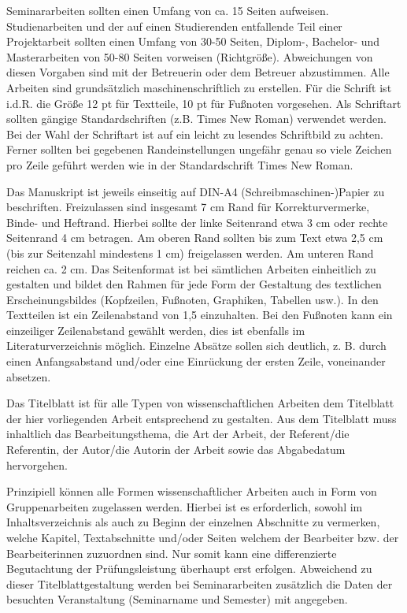 \documentclass[a4paper, 12pt]{article}
\begin{document}
Seminararbeiten sollten einen Umfang von ca. 15 Seiten aufweisen. Studienarbeiten
und der auf einen Studierenden entfallende Teil einer Projektarbeit sollten einen
Umfang von 30-50 Seiten, Diplom-, Bachelor- und Masterarbeiten von 50-80 Seiten
vorweisen (Richtgr\"{o}\ss e). Abweichungen von diesen Vorgaben sind mit der Betreuerin
oder dem Betreuer abzustimmen. Alle Arbeiten sind grunds\"{a}tzlich maschinenschriftlich
zu erstellen. F\"{u}r die Schrift ist i.d.R. die Gr\"{o}\ss e 12 pt f\"{u}r Textteile, 10 pt f\"{u}r
Fu\ss noten vorgesehen. Als Schriftart sollten g\"{a}ngige Standardschriften (z.B. Times
New Roman) verwendet werden. Bei der Wahl der Schriftart ist auf ein leicht zu
lesendes Schriftbild zu achten. Ferner sollten bei gegebenen Randeinstellungen
ungef\"{a}hr genau so viele Zeichen pro Zeile gef\"{u}hrt werden wie in der Standardschrift
Times New Roman.

Das Manuskript ist jeweils einseitig auf DIN-A4 (Schreibmaschinen-)Papier zu
beschriften. Freizulassen sind insgesamt 7 cm Rand f\"{u}r Korrekturvermerke, Binde- und
Heftrand. Hierbei sollte der linke Seitenrand etwa 3 cm oder rechte Seitenrand 4 cm
betragen. Am oberen Rand sollten bis zum Text etwa 2,5 cm (bis zur Seitenzahl
mindestens 1 cm) freigelassen werden. Am unteren Rand reichen ca. 2 cm. Das
Seitenformat ist bei s\"{a}mtlichen Arbeiten einheitlich zu gestalten und bildet den
Rahmen f\"{u}r jede Form der Gestaltung des textlichen Erscheinungsbildes (Kopfzeilen,
Fu\ss noten, Graphiken, Tabellen usw.). In den Textteilen ist ein Zeilenabstand von 1,5
einzuhalten. Bei den Fu\ss noten kann ein einzeiliger Zeilenabstand gew\"{a}hlt werden,
dies ist ebenfalls im Literaturverzeichnis m\"{o}glich. Einzelne Abs\"{a}tze sollen sich
deutlich, z. B. durch einen Anfangsabstand und/oder eine Einr\"{u}ckung der ersten
Zeile, voneinander absetzen.

Das Titelblatt ist f\"{u}r alle Typen von wissenschaftlichen Arbeiten dem Titelblatt der
hier vorliegenden Arbeit entsprechend zu gestalten. Aus dem Titelblatt muss
inhaltlich das Bearbeitungsthema, die Art der Arbeit, der Referent/die Referentin,
der Autor/die Autorin der Arbeit sowie das Abgabedatum hervorgehen.

Prinzipiell k\"{o}nnen alle Formen wissenschaftlicher Arbeiten auch in Form von
Gruppenarbeiten zugelassen werden. Hierbei ist es erforderlich, sowohl im
Inhaltsverzeichnis als auch zu Beginn der einzelnen Abschnitte zu vermerken, welche
Kapitel, Textabschnitte und/oder Seiten welchem der Bearbeiter bzw. der
Bearbeiterinnen zuzuordnen sind. Nur somit kann eine differenzierte Begutachtung der
Pr\"{u}fungsleistung \"{u}berhaupt erst erfolgen. Abweichend zu dieser Titelblattgestaltung
werden bei Seminararbeiten zus\"{a}tzlich die Daten der besuchten Veranstaltung
(Seminarname und Semester) mit angegeben.
\end{document}
